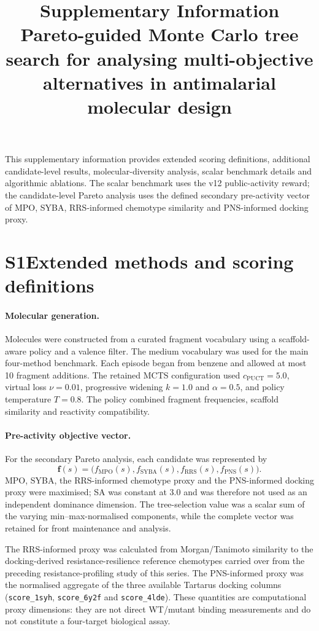 \documentclass[10pt,a4paper]{article}
\title{\textbf{Supplementary Information}\\[0.4em]
\large Pareto-guided Monte Carlo tree search for analysing multi-objective
alternatives in antimalarial molecular design}
\author{}
\date{}
\begin{document}
\maketitle

This supplementary information provides extended scoring definitions, additional candidate-level results, molecular-diversity analysis, scalar benchmark details and algorithmic ablations. The scalar benchmark uses the v12 public-activity reward; the candidate-level Pareto analysis uses the defined secondary pre-activity vector of MPO, SYBA, RRS-informed chemotype similarity and PNS-informed docking proxy.

\section*{S1\hspace{0.6em}Extended methods and scoring definitions}

\paragraph{Molecular generation.}
Molecules were constructed from a curated fragment vocabulary using a
scaffold-aware policy and a valence filter. The medium vocabulary was used for
the main four-method benchmark. Each episode began from benzene and allowed at
most \num{10} fragment additions. The retained MCTS configuration used
$c_{\mathrm{PUCT}}=\num{5.0}$, virtual loss $\nu=\num{0.01}$, progressive
widening $k=\num{1.0}$ and $\alpha=\num{0.5}$, and policy temperature
$T=\num{0.8}$. The policy combined fragment frequencies, scaffold similarity
and reactivity compatibility.

\paragraph{Pre-activity objective vector.}
For the secondary Pareto analysis, each candidate was represented by
\[
  \mathbf{f}(s)=\bigl(f_{\mathrm{MPO}}(s),f_{\mathrm{SYBA}}(s),
  f_{\mathrm{RRS}}(s),f_{\mathrm{PNS}}(s)\bigr).
\]
MPO, SYBA, the RRS-informed chemotype proxy and the PNS-informed docking
proxy were maximised; SA was constant at \num{3.0} and was therefore not
used as an independent dominance dimension. The tree-selection value was a
scalar sum of the varying min--max-normalised components, while the complete
vector was retained for front maintenance and analysis.

The RRS-informed proxy was calculated from Morgan/Tanimoto similarity to the
docking-derived resistance-resilience reference chemotypes carried over from the
preceding resistance-profiling study of this series. The PNS-informed proxy was the
normalised aggregate of the three available Tartarus docking columns
(\texttt{score\_1syh}, \texttt{score\_6y2f} and \texttt{score\_4lde}). These
quantities are computational proxy dimensions: they are not direct WT/mutant
binding measurements and do not constitute a four-target biological assay.
\end{document}
